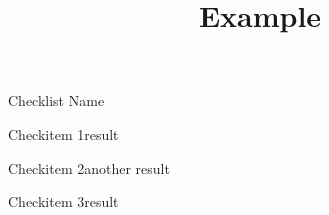 \def\papersize{4}




\title{Example}

\begin{checklist}{Checklist Name}
  \item{Checkitem 1}{result}
  \item{Checkitem 2}{another result}
    \item{Checkitem 3}{result}
\end{checklist}

